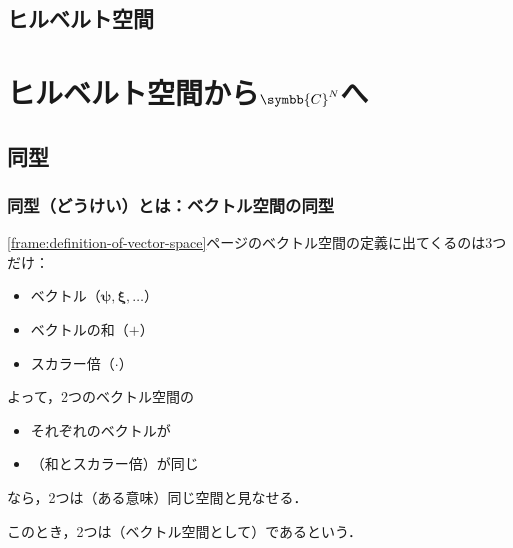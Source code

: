 \documentclass[
    10pt,
    ]{sotsu-beamer}
\begin{document}
\subsection{ヒルベルト空間}





\section{ヒルベルト空間から\texorpdfstring{$\symbb{C}^N$}{ℂ\textasciicircum 𝑁}へ}

\subsection{同型}


\begin{frame}
    \frametitle{同型（どうけい）とは：ベクトル空間の同型}

    \ref{frame:definition-of-vector-space}ページのベクトル空間の定義に出てくるのは3つだけ：
    \begin{itemize}
        \item ベクトル（$\symbf{\psi}, \symbf{\xi}, \dotsc$）
        \item ベクトルの和（$+$）
        \item スカラー倍（$\cdotp$）
    \end{itemize}

    \pause

    よって，2つのベクトル空間の
    \begin{itemize}
        \item それぞれのベクトルが
        \item {}（和とスカラー倍）が同じ
    \end{itemize}
    なら，2つは（ある意味）同じ空間と見なせる．

    このとき，2つは（ベクトル空間として）であるという．
    
\end{frame}
\end{document}
